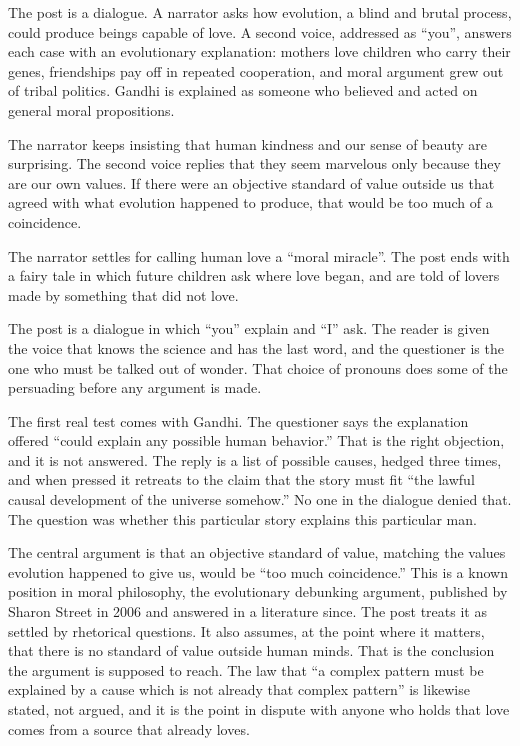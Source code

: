 \begin{afterword}
\summaryhead

The post is a dialogue. A narrator asks how evolution, a blind and brutal process, could produce beings capable of love. A second voice, addressed as ``you'', answers each case with an evolutionary explanation: mothers love children who carry their genes, friendships pay off in repeated cooperation, and moral argument grew out of tribal politics. Gandhi is explained as someone who believed and acted on general moral propositions.

The narrator keeps insisting that human kindness and our sense of beauty are surprising. The second voice replies that they seem marvelous only because they are our own values. If there were an objective standard of value outside us that agreed with what evolution happened to produce, that would be too much of a coincidence.

The narrator settles for calling human love a ``moral miracle''. The post ends with a fairy tale in which future children ask where love began, and are told of lovers made by something that did not love.

\responsehead

The post is a dialogue in which ``you'' explain and ``I'' ask. The reader is given the voice that knows the science and has the last word, and the questioner is the one who must be talked out of wonder. That choice of pronouns does some of the persuading before any argument is made.

The first real test comes with Gandhi. The questioner says the explanation offered ``could explain any possible human behavior.'' That is the right objection, and it is not answered. The reply is a list of possible causes, hedged three times, and when pressed it retreats to the claim that the story must fit ``the lawful causal development of the universe somehow.'' No one in the dialogue denied that. The question was whether this particular story explains this particular man.

The central argument is that an objective standard of value, matching the values evolution happened to give us, would be ``too much coincidence.'' This is a known position in moral philosophy, the evolutionary debunking argument, published by Sharon Street in 2006 and answered in a literature since. The post treats it as settled by rhetorical questions. It also assumes, at the point where it matters, that there is no standard of value outside human minds. That is the conclusion the argument is supposed to reach. The law that ``a complex pattern must be explained by a cause which is not already that complex pattern'' is likewise stated, not argued, and it is the point in dispute with anyone who holds that love comes from a source that already loves.


\end{afterword}
